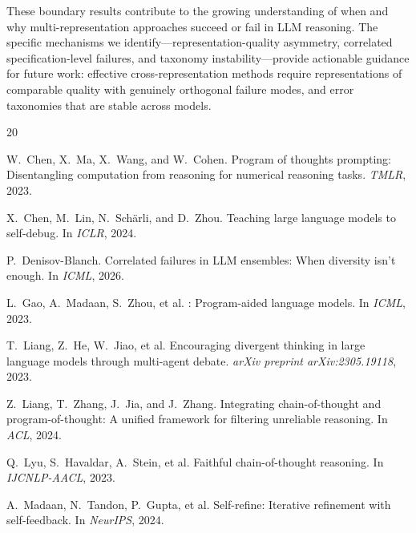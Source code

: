 \documentclass[11pt]{article}
\begin{document}
These boundary results contribute to the growing understanding of when and why multi-representation approaches succeed or fail in LLM reasoning. The specific mechanisms we identify---representation-quality asymmetry, correlated specification-level failures, and taxonomy instability---provide actionable guidance for future work: effective cross-representation methods require representations of comparable quality with genuinely orthogonal failure modes, and error taxonomies that are stable across models.



\begin{thebibliography}{20}

W.~Chen, X.~Ma, X.~Wang, and W.~Cohen.
\newblock Program of thoughts prompting: Disentangling computation from reasoning for numerical reasoning tasks.
\newblock \emph{TMLR}, 2023.

X.~Chen, M.~Lin, N.~Sch\"{a}rli, and D.~Zhou.
\newblock Teaching large language models to self-debug.
\newblock In \emph{ICLR}, 2024.

P.~Denisov-Blanch.
\newblock Correlated failures in LLM ensembles: When diversity isn't enough.
\newblock In \emph{ICML}, 2026.

L.~Gao, A.~Madaan, S.~Zhou, et al.
: Program-aided language models.
\newblock In \emph{ICML}, 2023.

T.~Liang, Z.~He, W.~Jiao, et al.
\newblock Encouraging divergent thinking in large language models through multi-agent debate.
\newblock \emph{arXiv preprint arXiv:2305.19118}, 2023.

Z.~Liang, T.~Zhang, J.~Jia, and J.~Zhang.
\newblock Integrating chain-of-thought and program-of-thought: A unified framework for filtering unreliable reasoning.
\newblock In \emph{ACL}, 2024.

Q.~Lyu, S.~Havaldar, A.~Stein, et al.
\newblock Faithful chain-of-thought reasoning.
\newblock In \emph{IJCNLP-AACL}, 2023.

A.~Madaan, N.~Tandon, P.~Gupta, et al.
\newblock Self-refine: Iterative refinement with self-feedback.
\newblock In \emph{NeurIPS}, 2024.


\end{thebibliography}
\end{document}
